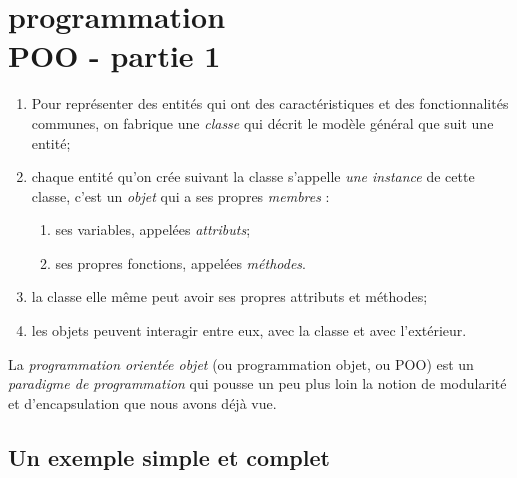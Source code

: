 \documentclass[a4paper,12pt,french]{book}
\begin{document}
    \chapter{\large programmation\\[-1em]\fontsize{35pt}{42pt}\selectfont\titlefont POO - partie 1}
    

    \begin{aretenir}
        \begin{enumerate}[--]
            \item     Pour représenter des  entités qui ont des caractéristiques et des fonctionnalités communes, on fabrique  une \textit{classe} qui décrit le modèle général que suit une entité;
            \item     chaque entité qu'on crée suivant la classe s'appelle \textit{une instance} de cette classe, c'est un \textit{objet} qui a ses propres \textit{membres} :
            \begin{enumerate}[--]
                \item     ses variables, appelées \textit{attributs};
                \item     ses propres fonctions, appelées \textit{méthodes}.    
            \end{enumerate}
            \item     la classe elle même peut avoir ses propres attributs et méthodes;
            \item     les objets peuvent interagir entre eux, avec la classe et \og avec l'extérieur\fg{}.
        \end{enumerate}
        
    \end{aretenir}
    
        La \textit{programmation orientée objet} (ou programmation objet, ou POO) est un \textit{paradigme de programmation} qui pousse un peu plus loin la notion de modularité et d'encapsulation que nous avons déjà vue. 
        
    \section{Un exemple simple et complet}
    
\end{document}
